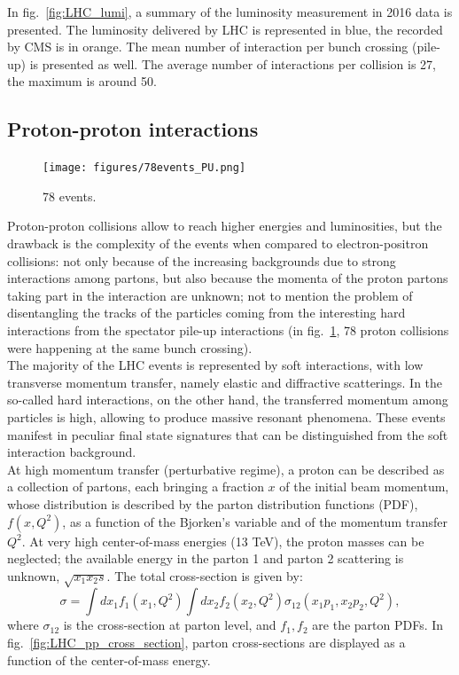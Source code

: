 \noindent In fig.~\ref{fig:LHC_lumi}, a summary of the luminosity measurement in 2016 data is presented. The luminosity delivered by LHC is represented in blue, the recorded by CMS is in orange. The mean number of interaction per bunch crossing (pile-up) is presented as well. The average number of interactions per collision is 27, the maximum is around 50.

\subsection{Proton-proton interactions}
\begin{figure}[!htb]
  \centering
    \texttt{[image: figures/78events\_PU.png]}
  \caption{78 events.}
  \label{fig:pp_pileup}
\end{figure}
Proton-proton collisions allow to reach higher energies and luminosities, but the drawback is the complexity of the events when compared to electron-positron collisions: not only because of the increasing backgrounds due to strong interactions among partons, but also because the momenta of the proton partons taking part in the interaction are unknown; not to mention the problem of disentangling the tracks of the particles coming from the interesting hard interactions from the spectator pile-up interactions (in fig.~\ref{fig:pp_pileup}, 78 proton collisions were happening at the same bunch crossing).\\
The majority of the LHC events is represented by soft interactions, with low transverse momentum transfer, namely elastic and diffractive scatterings. In the so-called hard interactions, on the other hand, the transferred momentum among particles is high, allowing to produce massive resonant phenomena. These events manifest in peculiar final state signatures that can be distinguished from the soft interaction background.\\
At high momentum transfer (perturbative regime), a proton can be described as a collection of partons, each bringing a fraction $x$ of the initial beam momentum, whose distribution is described by the parton distribution functions (PDF), $f(x,Q^2)$, as a function of the Bjorken's variable and of the momentum transfer $Q^2$. At very high center-of-mass energies (13 TeV), the proton masses can be neglected; the available energy in the parton 1 and parton 2 scattering is unknown, $\sqrt{x_1 x_2 s}$. The total cross-section is given by:
\begin{equation}
\sigma = \int dx_1 f_1(x_1,Q^2) \int dx_2 f_2(x_2,Q^2) \sigma_{12}(x_1 p_1, x_2 p_2, Q^2),
\end{equation}
where $\sigma_{12}$ is the cross-section at parton level, and $f_1,f_2$ are the parton PDFs. In fig.~\ref{fig:LHC_pp_cross_section}, parton cross-sections are displayed as a function of the center-of-mass energy.

